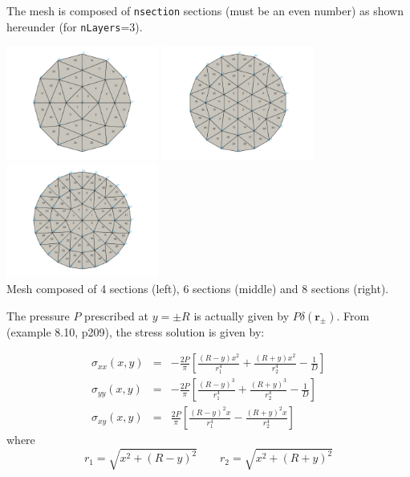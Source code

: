 The mesh is composed of {\tt nsection} sections (must be an even number)
as shown hereunder (for {\tt nLayers}=3). 
\begin{center}
\includegraphics[width=5cm]{python_codes/fieldstone_58/images/mesh4}
\includegraphics[width=5cm]{python_codes/fieldstone_58/images/mesh6}
\includegraphics[width=5cm]{python_codes/fieldstone_58/images/mesh8}\\
{\captionfont Mesh composed of 4 sections (left), 6 sections (middle) and 8 sections (right).}
\end{center}

The pressure $P$ prescribed at $y=\pm R$ is actually given by $P \delta({\bm r_\pm})$. 
From \cite{sadd14} (example 8.10, p209), the stress solution is given by:

\begin{eqnarray}
\sigma_{xx}(x,y)&=& -\frac{2P}{\pi}\left[\frac{(R-y)x^2}{r_1^4} + \frac{(R+y)x^2}{r_2^4} -\frac{1}{D} \right] \\
\sigma_{yy}(x,y)&=& -\frac{2P}{\pi}\left[\frac{(R-y)^3}{r_1^4} + \frac{(R+y)^3}{r_2^4} -\frac{1}{D} \right] \\
\sigma_{xy}(x,y)&=&  \frac{2P}{\pi}\left[\frac{(R-y)^2 x}{r_1^4} - \frac{(R+y)^2x}{r_2^4}  \right]
\end{eqnarray}
where 
\[
r_1=\sqrt{x^2 + (R-y)^2}
\quad\quad
r_2=\sqrt{x^2 + (R+y)^2}
\]

